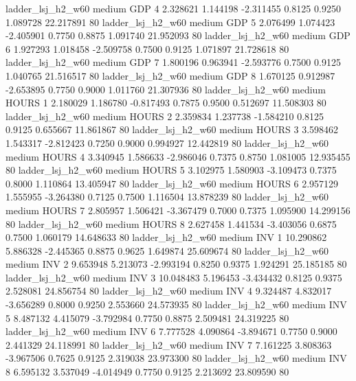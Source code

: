      ladder_lsj_h2_w60     medium      GDP                 4  2.328621 1.144198 -2.311455 0.8125 0.9250  1.089728   22.217891 80
     ladder_lsj_h2_w60     medium      GDP                 5  2.076499 1.074423 -2.405901 0.7750 0.8875  1.091740   21.952093 80
     ladder_lsj_h2_w60     medium      GDP                 6  1.927293 1.018458 -2.509758 0.7500 0.9125  1.071897   21.728618 80
     ladder_lsj_h2_w60     medium      GDP                 7  1.800196 0.963941 -2.593776 0.7500 0.9125  1.040765   21.516517 80
     ladder_lsj_h2_w60     medium      GDP                 8  1.670125 0.912987 -2.653895 0.7750 0.9000  1.011760   21.307936 80
     ladder_lsj_h2_w60     medium    HOURS                 1  2.180029 1.186780 -0.817493 0.7875 0.9500  0.512697   11.508303 80
     ladder_lsj_h2_w60     medium    HOURS                 2  2.359834 1.237738 -1.584210 0.8125 0.9125  0.655667   11.861867 80
     ladder_lsj_h2_w60     medium    HOURS                 3  3.598462 1.543317 -2.812423 0.7250 0.9000  0.994927   12.442819 80
     ladder_lsj_h2_w60     medium    HOURS                 4  3.340945 1.586633 -2.986046 0.7375 0.8750  1.081005   12.935455 80
     ladder_lsj_h2_w60     medium    HOURS                 5  3.102975 1.580903 -3.109473 0.7375 0.8000  1.110864   13.405947 80
     ladder_lsj_h2_w60     medium    HOURS                 6  2.957129 1.555955 -3.264380 0.7125 0.7500  1.116504   13.878239 80
     ladder_lsj_h2_w60     medium    HOURS                 7  2.805957 1.506421 -3.367479 0.7000 0.7375  1.095900   14.299156 80
     ladder_lsj_h2_w60     medium    HOURS                 8  2.627458 1.441534 -3.403056 0.6875 0.7500  1.060179   14.648633 80
     ladder_lsj_h2_w60     medium      INV                 1 10.290862 5.886328 -2.445365 0.8875 0.9625  1.649874   25.609674 80
     ladder_lsj_h2_w60     medium      INV                 2  9.653948 5.213073 -2.993194 0.8250 0.9375  1.924291   25.185185 80
     ladder_lsj_h2_w60     medium      INV                 3 10.048483 5.196453 -3.434432 0.8125 0.9375  2.528081   24.856754 80
     ladder_lsj_h2_w60     medium      INV                 4  9.324487 4.832017 -3.656289 0.8000 0.9250  2.553660   24.573935 80
     ladder_lsj_h2_w60     medium      INV                 5  8.487132 4.415079 -3.792984 0.7750 0.8875  2.509481   24.319225 80
     ladder_lsj_h2_w60     medium      INV                 6  7.777528 4.090864 -3.894671 0.7750 0.9000  2.441329   24.118991 80
     ladder_lsj_h2_w60     medium      INV                 7  7.161225 3.808363 -3.967506 0.7625 0.9125  2.319038   23.973300 80
     ladder_lsj_h2_w60     medium      INV                 8  6.595132 3.537049 -4.014949 0.7750 0.9125  2.213692   23.809590 80
